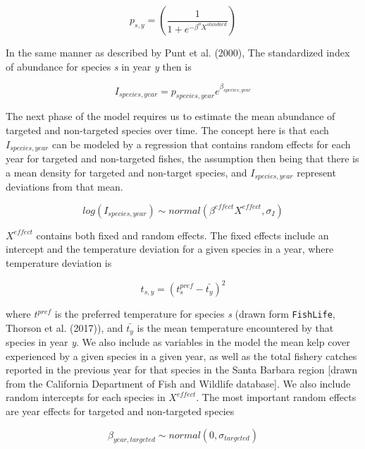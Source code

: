 \documentclass[]{article}
\begin{document}
\begin{equation}
p_{s,y} = (\frac{1}{1 +e^{-\beta^{o}{X^{standard}}}})
  \label{eq:pdetect}
\end{equation}

In the same manner as described by Punt et al. (2000), The standardized index of abundance for species \emph{s} in year \emph{y} then is

\begin{equation}
I_{species,year} = p_{species,year}e^{\beta_{species,year}}
  \label{eq:index}
\end{equation}

The next phase of the model requires us to estimate the mean abundance of targeted and non-targeted species over time. The concept here is that each \(I_{species,year}\) can be modeled by a regression that contains random effects for each year for targeted and non-targeted fishes, the assumption then being that there is a mean density for targeted and non-target species, and \(I_{species,year}\) represent deviations from that mean.

\begin{equation}
log(I_{species,year}) \sim normal(\beta^{effect}X^{effect}, \sigma_I)
  \label{eq:indexprior}
\end{equation}

\(X^{effect}\) contains both fixed and random effects. The fixed effects include an intercept and the temperature deviation for a given species in a year, where temperature deviation is

\begin{equation}
t_{s,y} = (t^{pref}_{s} -  \bar{t_{y}})^2
  \label{eq:tempdev}
\end{equation}

where \(t^{pref}\) is the preferred temperature for species \emph{s} (drawn form \texttt{FishLife}, Thorson et al. (2017)), and \(\bar{t_{y}}\) is the mean temperature encountered by that species in year \emph{y}. We also include as variables in the model the mean kelp cover experienced by a given species in a given year, as well as the total fishery catches reported in the previous year for that species in the Santa Barbara region {[}drawn from the California Department of Fish and Wildlife database{]}. We also include random intercepts for each species in \(X^{effect}\). The most important random effects are year effects for targeted and non-targeted species

\begin{equation}
\beta_{year,targeted} \sim normal(0,\sigma_{targeted})
  \label{eq:betatarg}
\end{equation}
\end{document}
